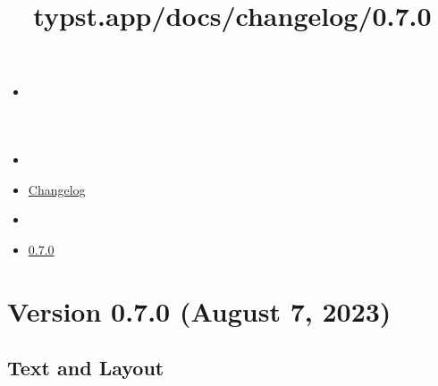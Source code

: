 \title{typst.app/docs/changelog/0.7.0}

\begin{itemize}
\tightlist
\item
  \href{/docs}{}
\item
  
\item
  \href{/docs/changelog/}{Changelog}
\item
  
\item
  \href{/docs/changelog/0.7.0/}{0.7.0}
\end{itemize}

\section{Version 0.7.0 (August 7,
2023)}\label{version-0.7.0-august-7-2023}

\subsection{Text and Layout}\label{text-and-layout}

